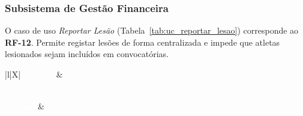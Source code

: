 \subsubsection{Subsistema de Gestão Financeira}


O caso de uso \textit{Reportar Lesão} (Tabela~\ref{tab:uc_reportar_lesao}) corresponde ao \textbf{RF-12}. Permite registar lesões de forma centralizada e impede que atletas lesionados sejam incluídos em convocatórias.

{\small
{}
\begin{xltabular}{\textwidth}{|l|X|}
\hline
{}\textcolor{white}{\textbf{Campo}} & \textcolor{white}{\textbf{Descrição}} \\ \hline
\endfirsthead

 \\
\hline
{}\textcolor{white}{\textbf{Campo}} & \textcolor{white}{\textbf{Descrição}} \\ \hline
\endhead

\hline {} \\ \hline \endfoot

\hline
\caption{Caso de uso ``Reportar Lesão''.}
\label{tab:uc_reportar_lesao} \\
\endlastfoot


\end{xltabular}}
